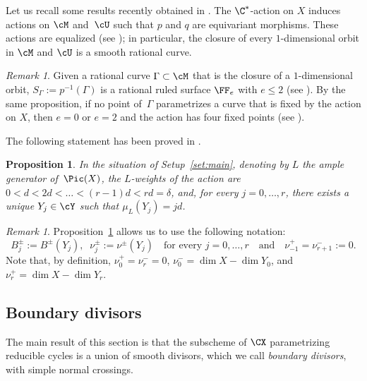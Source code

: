\documentclass[11pt]{amsart}
\numberwithin{equation}{section}
\newtheorem{proposition}[theorem]{Proposition}
\theoremstyle{definition}
\theoremstyle{remark}
\newtheorem{remark}[theorem]{Remark}
\begin{document}
Let us recall some results recently obtained in \cite{OS2}. 
The $\C^*$-action on $X$ induces actions on $\cM$ and~$\cU$ such that $p$ and $q$ are equivariant morphisms. These actions are equalized (see \cite[Propositions 4.5 and 4.8]{OS2}); in particular, the closure of every  $1$-dimensional orbit in $\cM$ and $\cU$ is a smooth rational curve.

\begin{remark}\label{rem:f2}
Given a rational curve $\Gamma \subset \cM$ that is the closure of a $1$-dimensional orbit, $S_\Gamma:=p^{-1}(\Gamma)$ is a rational ruled surface $\FF_e$ with $e \le 2$ (see \cite[Proposition 4.6]{OS2}). By the same proposition, if no point of~$\Gamma$ parametrizes a curve that is fixed by the action on $X$, then $e=0$ or $e=2$ and the action has four fixed points (see \cite[Figure 4.1]{OS2}).
\end{remark}
 
 The following statement has been proved in \cite[Theorem 5.3]{OS2}.
 
 \begin{proposition}\label{prop:onecomp}
 In the situation of Setup~\ref{set:main}, denoting by $L$ the ample generator of\, $\Pic(X)$, the $L$-weights of the action are $0 < d < 2d < \dots < (r-1)d < rd = \delta$, and, for every $j =0, \dots, r$, there exists a unique $Y_j \in \cY$ such that $\mu_L(Y_j)=jd$.
\end{proposition}

\begin{remark}\label{rem:convex} 
 Proposition~\ref{prop:onecomp} allows us to use the following notation:
  \[
  B_j^\pm:=B^\pm(Y_j),\;\; \nu^\pm_j:=\nu^\pm(Y_j)\quad\mbox{for every $j=0, \dots, r$}\quad \mbox{and}\quad \nu^+_{-1}=\nu^-_{r+1}:=0.\] Note that, by definition, $\nu^+_0=\nu^-_r=0$, $\nu^-_0=\dim X-\dim Y_0$, and $\nu^+_r=\dim X-\dim Y_r$.
\end{remark}

\subsection{Boundary divisors}\label{ssec:boundary}


The main result of this section is that the subscheme of $\CX$ parametrizing reducible cycles is a union of smooth divisors, which we call {\em boundary divisors}, with simple normal crossings. 
\end{document}
